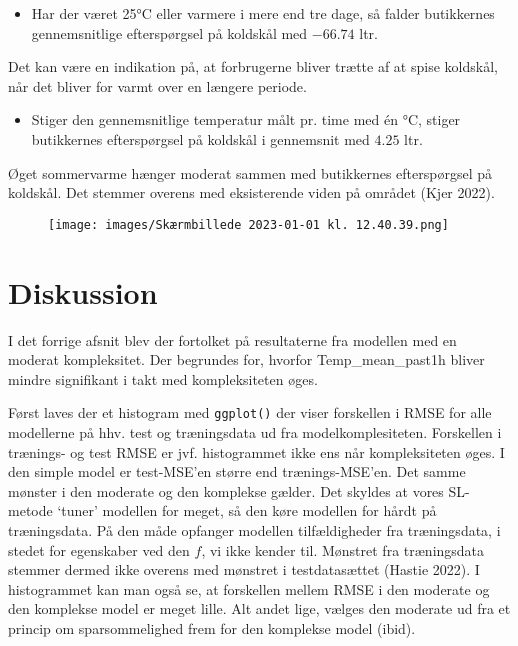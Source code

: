\documentclass[
  12pt,
  a4paper,
  DIV=11,
  numbers=noendperiod,
  oneside,
  open=any]{scrartcl}
\providecommand{\tightlist}{%
  \setlength{\itemsep}{0pt}\setlength{\parskip}{0pt}}\usepackage{longtable,booktabs,array}
\begin{document}
\begin{itemize}
\tightlist
\item
  Har der været 25°C eller varmere i mere end tre dage, så falder
  butikkernes gennemsnitlige efterspørgsel på koldskål med \(-66.74\)
  ltr.
\end{itemize}

Det kan være en indikation på, at forbrugerne bliver trætte af at spise
koldskål, når det bliver for varmt over en længere periode.

\begin{itemize}
\tightlist
\item
  Stiger den gennemsnitlige temperatur målt pr. time med én °C, stiger
  butikkernes efterspørgsel på koldskål i gennemsnit med \(4.25\) ltr.
\end{itemize}

Øget sommervarme hænger moderat sammen med butikkernes efterspørgsel på
koldskål. Det stemmer overens med eksisterende viden på området (Kjer
2022).

\begin{figure}

{\centering \texttt{[image: images/Skærmbillede 2023-01-01 kl. 12.40.39.png]}

}

\end{figure}

\hypertarget{diskussion}{%
\section{Diskussion}\label{diskussion}}

I det forrige afsnit blev der fortolket på resultaterne fra modellen med
en moderat kompleksitet. Der begrundes for, hvorfor Temp\_mean\_past1h
bliver mindre signifikant i takt med kompleksiteten øges.

Først laves der et histogram med \texttt{ggplot()} der viser forskellen
i RMSE for alle modellerne på hhv. test og træningsdata ud fra
modelkomplesiteten. Forskellen i trænings- og test RMSE er jvf.
histogrammet ikke ens når kompleksiteten øges. I den simple model er
test-MSE'en større end trænings-MSE'en. Det samme mønster i den moderate
og den komplekse gælder. Det skyldes at vores SL-metode `tuner' modellen
for meget, så den køre modellen for hårdt på træningsdata. På den måde
opfanger modellen tilfældigheder fra træningsdata, i stedet for
egenskaber ved den \(f\), vi ikke kender til. Mønstret fra træningsdata
stemmer dermed ikke overens med mønstret i testdatasættet (Hastie 2022).
I histogrammet kan man også se, at forskellen mellem RMSE i den moderate
og den komplekse model er meget lille. Alt andet lige, vælges den
moderate ud fra et princip om sparsommelighed frem for den komplekse
model (ibid).
\end{document}
